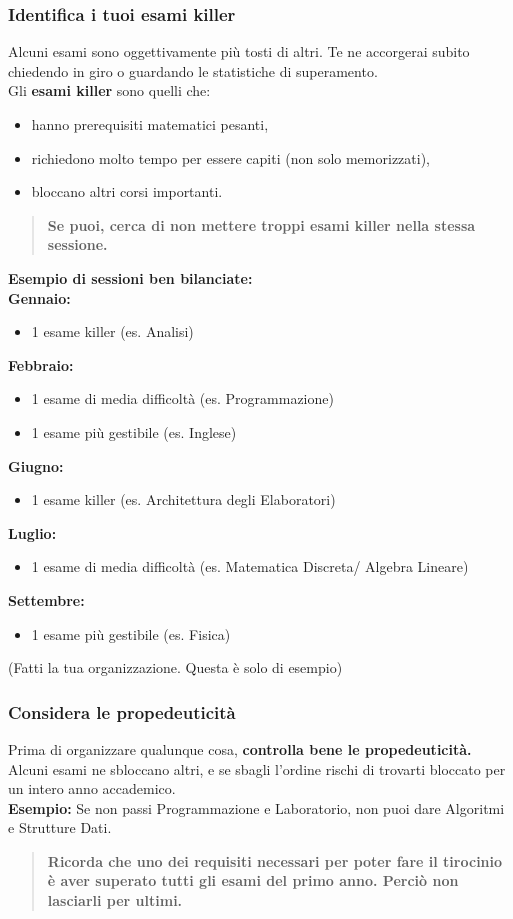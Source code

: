 \documentclass{article}
\begin{document}
\subsubsection{Identifica i tuoi esami killer}
Alcuni esami sono oggettivamente più tosti di altri. Te ne accorgerai subito chiedendo in giro o guardando le statistiche di superamento.\\
Gli \textbf{esami killer} sono quelli che:
\begin{itemize}
\item hanno prerequisiti matematici pesanti,
\item richiedono molto tempo per essere capiti (non solo memorizzati),
\item bloccano altri corsi importanti.
\end{itemize}
\begin{quote}
\textbf{Se puoi, cerca di non mettere troppi esami killer nella stessa sessione.}
\end{quote}
\textbf{Esempio di sessioni ben bilanciate:}\\
\textbf{Gennaio:}
\begin{itemize}
\item 1 esame killer (es. Analisi)
\end{itemize}
\textbf{Febbraio:}
\begin{itemize}
\item 1 esame di media difficoltà (es. Programmazione)
\item 1 esame più gestibile (es. Inglese)
\end{itemize}
\textbf{Giugno:}
\begin{itemize}
\item 1 esame killer (es. Architettura degli Elaboratori)
\end{itemize}
\textbf{Luglio:}
\begin{itemize}
\item 1 esame di media difficoltà (es. Matematica Discreta/ Algebra Lineare)
\end{itemize}
\textbf{Settembre:}
\begin{itemize}
\item 1 esame più gestibile (es. Fisica)
\end{itemize}
(Fatti la tua organizzazione. Questa è solo di esempio)


\subsubsection{Considera le propedeuticità}
Prima di organizzare qualunque cosa, \textbf{controlla bene le propedeuticità.}  
Alcuni esami ne sbloccano altri, e se sbagli l'ordine rischi di trovarti bloccato per un intero anno accademico.\\
\textbf{Esempio:} Se non passi Programmazione e Laboratorio, non puoi dare Algoritmi e Strutture Dati.\\
\begin{quote}
\textbf{Ricorda che uno dei requisiti necessari per poter fare il tirocinio è aver superato tutti gli esami del primo anno. Perciò non lasciarli per ultimi.}
\end{quote}
\end{document}
